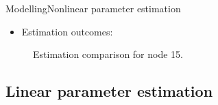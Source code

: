 \begin{frame}{Modelling}{Nonlinear parameter estimation}
\begin{itemize}
	\item<1-> Estimation outcomes: 	
\end{itemize}

\begin{figure}[H]
  \centering
  \begin{minipage}[b]{0.45\textwidth}
    
    \caption{Estimation comparison for node 10.}
  \end{minipage}
  \hfill
  \begin{minipage}[b]{0.45\textwidth}
   
    \caption{Estimation comparison for node 15.}
  \end{minipage}
\end{figure}
\end{frame}

\subsection{Linear parameter estimation}

